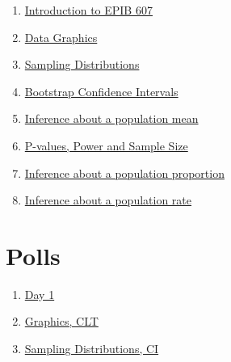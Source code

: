 \documentclass[]{book}
\providecommand{\tightlist}{%
  \setlength{\itemsep}{0pt}\setlength{\parskip}{0pt}}
\providecommand{\tightlist}{%
  \setlength{\itemsep}{0pt}\setlength{\parskip}{0pt}}
\theoremstyle{definition}
\theoremstyle{definition}
\theoremstyle{definition}
\theoremstyle{remark}
\begin{document}
\begin{enumerate}
\def\labelenumi{\arabic{enumi}.}
\tightlist
\item
  \href{https://docs.google.com/presentation/d/15c0YIS2KJXFzTKgFfQ_xDjTAcvPyQb8JhSLGvsEHJ6o/edit?usp=sharing}{Introduction
  to EPIB 607}
\item
  \href{https://docs.google.com/presentation/d/1wXgcTzcRKl_leGRfNZjWWPkjwJSTlZSXBCl-fFuLEaE/edit?usp=sharing}{Data
  Graphics}
\item
  \href{https://github.com/sahirbhatnagar/EPIB607/raw/master/slides/sampling_dist/EPIB607_sampling_dist.pdf}{Sampling
  Distributions}
\item
  \href{https://github.com/sahirbhatnagar/EPIB607/raw/master/slides/bootstrap/EPIB607_bootstrap.pdf}{Bootstrap
  Confidence Intervals}
\item
  \href{https://github.com/sahirbhatnagar/EPIB607/raw/master/slides/one_sample_mean/EPIB607_one_sample_mean.pdf}{Inference
  about a population mean}
\item
  \href{https://github.com/sahirbhatnagar/EPIB607/raw/master/slides/sample_size/EPIB607_sample_size.pdf}{P-values,
  Power and Sample Size}
\item
  \href{https://github.com/sahirbhatnagar/EPIB607/raw/master/slides/one_sample_prop/EPIB607_one_sample_prop.pdf}{Inference
  about a population proportion}
\item
  \href{https://github.com/sahirbhatnagar/EPIB607/raw/master/slides/one_sample_rate/EPIB607_one_sample_rate.pdf}{Inference
  about a population rate}
\end{enumerate}

\chapter{Polls}\label{polls}

\begin{enumerate}
\def\labelenumi{\arabic{enumi}.}
\tightlist
\item
  \href{https://github.com/sahirbhatnagar/EPIB607/raw/master/polls/001_day1_basic_concepts/001-day1.pdf}{Day
  1}
\item
  \href{https://github.com/sahirbhatnagar/EPIB607/raw/master/polls/002_viz_hist_clt/002-viz-hist-clt.pdf}{Graphics,
  CLT}
\item
  \href{https://github.com/sahirbhatnagar/EPIB607/raw/master/polls/003_sampling_dist_CI/003-sampling-dist-CI.pdf}{Sampling
  Distributions, CI}
\end{enumerate}
\end{document}
